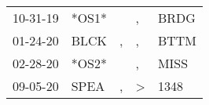\begin{supertabular}{lllll}
 10-31-19 &  *OS1* &    &             , &  BRDG \\
 01-24-20 &   BLCK &  , &             , &  BTTM \\
 02-28-20 &  *OS2* &    &             , &  MISS \\
 09-05-20 &   SPEA &  , &  \textgreater &  1348 \\
\end{supertabular}
